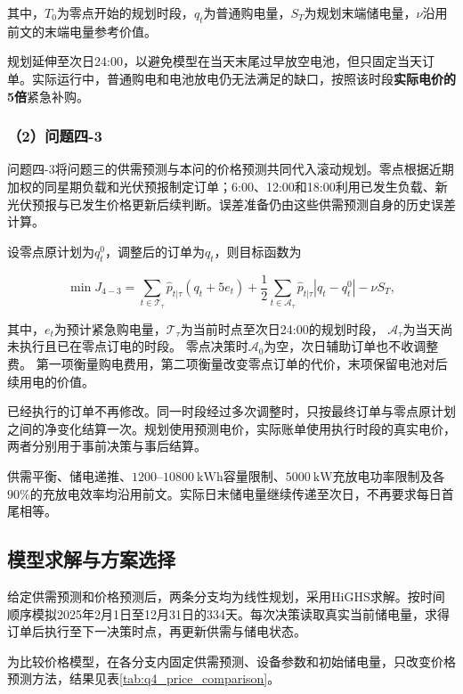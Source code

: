 其中，$T_0$为零点开始的规划时段，$q_t$为普通购电量，$S_T$为规划末端储电量，$\nu$沿用前文的末端电量参考价值。

规划延伸至次日24:00，以避免模型在当天末尾过早放空电池，但只固定当天订单。实际运行中，普通购电和电池放电仍无法满足的缺口，按照该时段\textbf{实际电价的5倍}紧急补购。

\subsubsection*{（2）问题四-3}

问题四-3将问题三的供需预测与本问的价格预测共同代入滚动规划。零点根据近期加权的同星期负载和光伏预报制定订单；6:00、12:00和18:00利用已发生负载、新光伏预报与已发生价格更新后续判断。误差准备仍由这些供需预测自身的历史误差计算。

设零点原计划为$q_t^0$，调整后的订单为$q_t$，则目标函数为

\begin{equation}
\min J_{4-3}
=
\sum_{t\in \mathcal T_{\tau}}
\hat{p}_{t|\tau}
\left(q_t+5e_t\right)
+
\frac{1}{2}
\sum_{t\in \mathcal A_{\tau}}
\hat{p}_{t|\tau}
\left|q_t-q_t^0\right|
-
\nu S_T,
\end{equation}

其中，$e_t$为预计紧急购电量，$\mathcal T_{\tau}$为当前时点至次日24:00的规划时段，
$\mathcal A_{\tau}$为当天尚未执行且已在零点订电的时段。
零点决策时$\mathcal A_0$为空，次日辅助订单也不收调整费。
第一项衡量购电费用，第二项衡量改变零点订单的代价，末项保留电池对后续用电的价值。

已经执行的订单不再修改。同一时段经过多次调整时，只按最终订单与零点原计划之间的净变化结算一次。规划使用预测电价，实际账单使用执行时段的真实电价，两者分别用于事前决策与事后结算。

供需平衡、储电递推、$1200$--$10800\ \mathrm{kWh}$容量限制、$5000\ \mathrm{kW}$充放电功率限制及各$90\%$的充放电效率均沿用前文。实际日末储电量继续传递至次日，不再要求每日首尾相等。

\subsection{模型求解与方案选择}

给定供需预测和价格预测后，两条分支均为线性规划，采用HiGHS求解。按时间顺序模拟2025年2月1日至12月31日的334天。每次决策读取真实当前储电量，求得订单后执行至下一决策时点，再更新供需与储电状态。

为比较价格模型，在各分支内固定供需预测、设备参数和初始储电量，只改变价格预测方法，结果见表\ref{tab:q4_price_comparison}。

